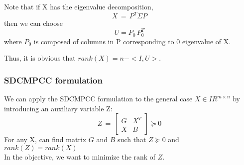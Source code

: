 \documentclass{beamer}
\newcommand{\re}{I\!\!\!R}
\begin{document}
\begin{frame}
Note that if X has the eigenvalue decomposition, 
\begin{displaymath}
X\,=\,P^T \Sigma P
\end{displaymath}
then we can choose 
\begin{displaymath}
U=P_0 \,P_0^T
\end{displaymath}
where $P_0$ is composed of columns in P corresponding to 0 eigenvalue of X.

\bigskip

Thus, it is obvious that $rank(X)=n-<I, U>$.

\end{frame}

\begin{frame}
\frametitle{SDCMPCC formulation}

\bigskip
We can apply the SDCMPCC formulation to the general case $X\in\re^{m\times n}$  by introducing an auxiliary variable Z:
\begin{displaymath}
Z\,=\,\left[\begin{array}{clcr}
G&X^T\\
X&B\end{array}\right]\succeq 0
\end{displaymath} 
For any X, can find matrix $G$ and $B$ such that $Z\succeq 0$ and $rank(Z)=rank(X)$\\
\bigskip
In the objective, we want to minimize the rank of $Z$.

\end{frame}


\end{document}
